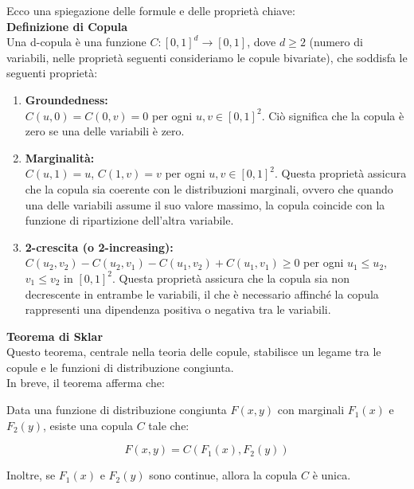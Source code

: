 \documentclass[a4paper,12pt]{article}
\begin{document}
\noindent Ecco una spiegazione delle formule e delle proprietà chiave: \\

\noindent \textbf{Definizione di Copula} \\ 

\noindent Una d-copula è una funzione $C: [0,1]^d \rightarrow [0,1]$, dove $d \geq 2$ (numero di variabili, nelle proprietà seguenti consideriamo le copule bivariate), che soddisfa le seguenti proprietà:

\begin{enumerate}
	\item  \textbf{Groundedness:} \\ $C(u, 0) = C(0, v) = 0$ per ogni $u, v \in [0,1]^2$. Ciò significa che la copula è zero se una delle variabili è zero.
	\item \textbf{Marginalità:} \\ $C(u, 1) = u$, $C(1, v) = v$ per ogni $u, v \in [0,1]^2$.  Questa proprietà assicura che la copula sia coerente con le distribuzioni marginali, ovvero che quando una delle variabili assume il suo valore massimo, la copula coincide con la funzione di ripartizione dell'altra variabile.
	\item \textbf{2-crescita (o 2-increasing):} \\  $C(u_2, v_2) - C(u_2, v_1) - C(u_1, v_2) + C(u_1, v_1) \geq 0$ per ogni $u_1 \leq u_2$, $v_1 \leq v_2$ in $[0,1]^2$. Questa proprietà assicura che la copula sia non decrescente in entrambe le variabili, il che è necessario affinché la copula rappresenti una dipendenza positiva o negativa tra le variabili.
\end{enumerate}

\noindent \textbf{Teorema di Sklar} \\ 

\noindent Questo teorema, centrale nella teoria delle copule, stabilisce un legame tra le copule e le funzioni di distribuzione congiunta. \\
In breve, il teorema afferma che:

\noindent Data una funzione di distribuzione congiunta $F(x, y)$ con marginali $F_1(x)$ e $F_2(y)$, esiste una copula $C$ tale che:

$$F(x, y) = C(F_1(x), F_2(y))$$

\noindent Inoltre, se $F_1(x)$ e $F_2(y)$ sono continue, allora la copula $C$ è unica. \\
\end{document}
